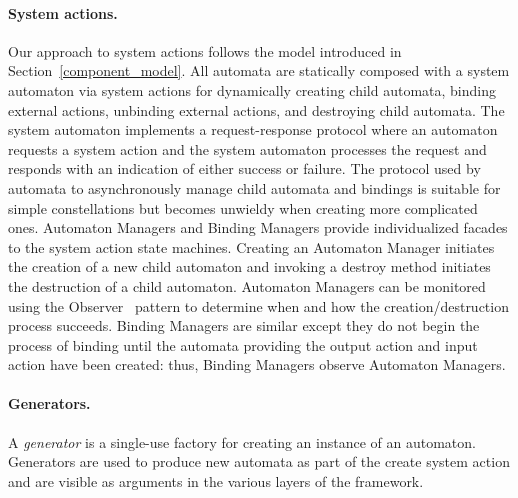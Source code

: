 \paragraph*{System actions.}
Our approach to system actions follows the model introduced in Section~\ref{component_model}.
All automata are statically composed with a system automaton via system actions for dynamically creating child automata, binding external actions, unbinding external actions, and destroying child automata.
The system automaton implements a request-response protocol where an automaton requests a system action and the system automaton processes the request and responds with an indication of either success or failure.
The protocol used by automata to asynchronously manage child automata and bindings is suitable for simple constellations but becomes unwieldy when creating more complicated ones.
Automaton Managers and Binding Managers provide individualized facades to the system action state machines.
Creating an Automaton Manager initiates the creation of a new child automaton and invoking a destroy method initiates the destruction of a child automaton.
Automaton Managers can be monitored using the Observer~\cite{gamma1995design} pattern to determine when and how the creation/destruction process succeeds.
Binding Managers are similar except they do not begin the process of binding until the automata providing the output action and input action have been created: thus, Binding Managers observe Automaton Managers.

\ifjournal
\paragraph*{Generators.}
A \emph{generator} is a single-use factory for creating an instance of an automaton.
Generators are used to produce new automata as part of the create system action and are visible as arguments in the various layers of the framework.
\fi
